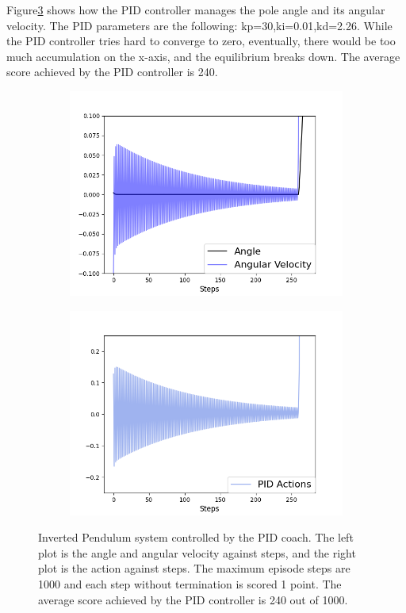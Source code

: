 \documentclass[smallextended]{svjour3}
\begin{document}
Figure\ref{fig:ip} shows how the PID controller manages the pole angle and its angular velocity. The PID parameters are the following: kp=30,ki=0.01,kd=2.26. While the PID controller tries hard to converge to zero, eventually, there would be too much accumulation on the x-axis, and the equilibrium breaks down. The average score achieved by the PID controller is 240.


\begin{figure}[H]
\centering
\begin{subfigure}{0.25\textwidth}
  \centering
  \includegraphics[width=\linewidth]{ip_PID.png}
  \label{fig:ip_pid}
\end{subfigure}%
\begin{subfigure}{.25\textwidth}
  \centering
  \includegraphics[width=\linewidth]{ip_PID_actions.png}
  \label{fig:ip_pid_actions}
\end{subfigure}
\caption{Inverted Pendulum system controlled by the PID coach. The left plot is the angle and angular velocity against steps, and the right plot is the action against steps. The maximum episode steps are 1000 and each step without termination is scored 1 point. The average score achieved by the PID controller is 240 out of 1000.}
\label{fig:ip}
\end{figure}
\end{document}
